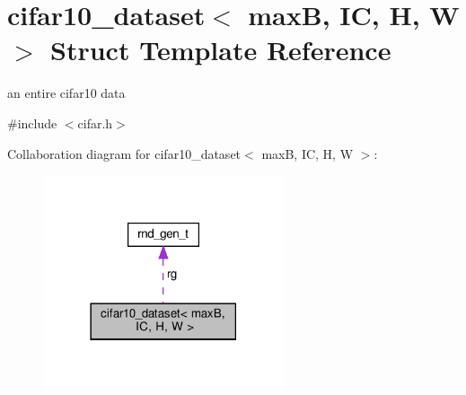\hypertarget{structcifar10__dataset}{}\section{cifar10\+\_\+dataset$<$ maxB, IC, H, W $>$ Struct Template Reference}
\label{structcifar10__dataset}


an entire cifar10 data  




{\ttfamily \#include $<$cifar.\+h$>$}



Collaboration diagram for cifar10\+\_\+dataset$<$ maxB, IC, H, W $>$\+:
\nopagebreak
\begin{figure}[H]
\begin{center}
\leavevmode
\includegraphics[width=201pt]{structcifar10__dataset__coll__graph}
\end{center}
\end{figure}
